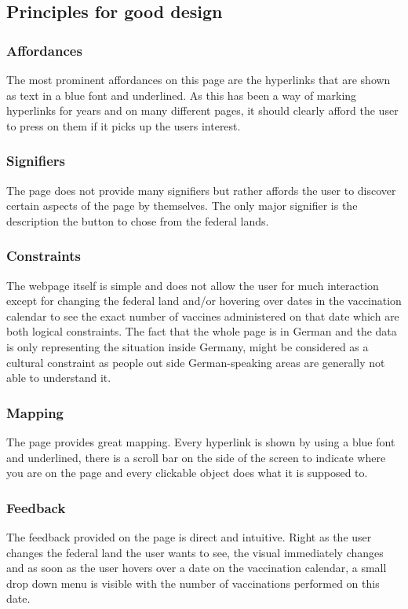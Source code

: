 \documentclass[12pt, letterpaper]{article}
\begin{document}
\subsection{Principles for good design}
\subsubsection{Affordances}
The most prominent affordances on this page are the hyperlinks that are shown as text in a blue font and underlined. As this has been a way of marking hyperlinks for years and on many different pages, it should clearly afford the user to press on them if it picks up the users interest.
\subsubsection{Signifiers}
The page does not provide many signifiers but rather affords the user to discover certain aspects of the page by themselves.  The only major signifier is the description the button to chose from the federal lands.
\subsubsection{Constraints}
The webpage itself is simple and does not allow the user for much interaction except for changing the federal land and/or hovering over dates in the vaccination calendar to see the exact number of vaccines administered on that date which are both logical constraints. The fact that the whole page is in German and the data is only representing the situation inside Germany, might be considered as a cultural constraint as people out side German-speaking areas are generally not able to understand it. 
\subsubsection{Mapping}
The page provides great mapping. Every hyperlink is shown by using a blue font and underlined, there is a scroll bar on the side of the screen to indicate where you are on the page and every clickable object does what it is supposed to.
\subsubsection{Feedback}
The feedback provided on the page is direct and intuitive. Right as the user changes the federal land the user wants to see, the visual immediately changes and as soon as the user hovers over a date on the vaccination calendar, a small drop down menu is visible with the number of vaccinations performed on this date.
\end{document}
